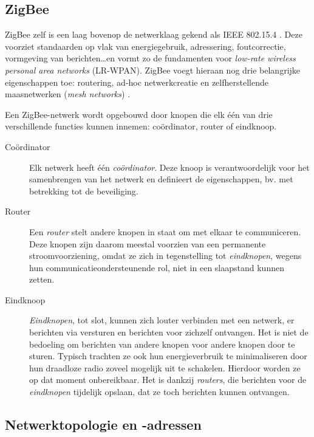 \subsection{ZigBee}
\label{subsection:zigbee}

ZigBee zelf is een laag bovenop de netwerklaag gekend als IEEE 802.15.4
\citep{ieee2009802.15.4}. Deze voorziet standaarden op vlak van energiegebruik,
adressering, foutcorrectie, vormgeving van berichten\dots en vormt zo de
fundamenten voor \emph{low-rate wireless personal area networks} (LR-WPAN).
ZigBee voegt hieraan nog drie belangrijke eigenschappen toe: routering, ad-hoc
netwerkcreatie en zelfherstellende maasnetwerken (\emph{mesh networks})
\citep{oreilly2010buildingwsn}.

Een ZigBee-netwerk wordt opgebouwd door knopen die elk \'e\'en van drie
verschillende functies kunnen innemen: co\"ordinator, router of eindknoop.

\begin{description}

  \item[Co\"ordinator] Elk netwerk heeft \'e\'en \emph{co\"ordinator}. Deze
  knoop is verantwoordelijk voor het samenbrengen van het netwerk en definieert
  de eigenschappen, bv. met betrekking tot de beveiliging.

  \item[Router] Een \emph{router} stelt andere knopen in staat om met elkaar te
  communiceren. Deze knopen zijn daarom meestal voorzien van een permanente
  stroomvoorziening, omdat ze zich in tegenstelling tot \emph{eindknopen},
  wegens hun communicatieondersteunende rol, niet in een slaapstand kunnen
  zetten.

  \item[Eindknoop] \emph{Eindknopen}, tot slot, kunnen zich louter verbinden
  met een netwerk, er berichten via versturen en berichten voor zichzelf
  ontvangen. Het is niet de bedoeling om berichten van andere knopen voor
  andere knopen door te sturen. Typisch trachten ze ook hun energieverbruik te
  minimaliseren door hun draadloze radio zoveel mogelijk uit te schakelen.
  Hierdoor worden ze op dat moment onbereikbaar. Het is dankzij \emph{routers},
  die berichten voor de \emph{eindknopen} tijdelijk opslaan, dat ze toch
  berichten kunnen ontvangen.

\end{description}

\subsection{Netwerktopologie en -adressen}
\label{subsection:topologie}

